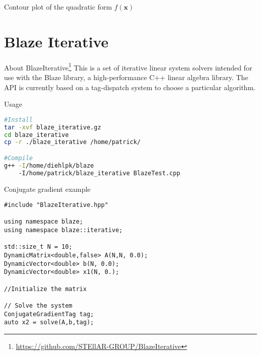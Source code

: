 \documentclass[12pt,t]{beamer}
\begin{document}
\begin{frame}{Contour plot of the quadratic form $f(\mathbf{x})$}

\begin{center}
\end{center}
\vspace{-0.5cm}
\end{frame}


\section{Blaze Iterative}


\begin{frame}[fragile]{About BlazeIterative\footnote{\tiny\url{https://github.com/STEllAR-GROUP/BlazeIterative}}}
This is a set of iterative linear system solvers intended for use with the Blaze library, a high-performance C++ linear algebra library. The API is currently based on a tag-dispatch system to choose a particular algorithm.

\begin{block}{Usage}
\begin{lstlisting}[language=bash]
#Install
tar -xvf blaze_iterative.gz
cd blaze_iterative
cp -r ./blaze_iterative /home/patrick/

#Compile
g++ -I/home/diehlpk/blaze 
    -I/home/patrick/blaze_iterative BlazeTest.cpp
\end{lstlisting}
\end{block}


\end{frame}

\begin{frame}[fragile]{Conjugate gradient example}
\begin{lstlisting}
#include "BlazeIterative.hpp"

using namespace blaze;
using namespace blaze::iterative;

std::size_t N = 10;
DynamicMatrix<double,false> A(N,N, 0.0);
DynamicVector<double> b(N, 0.0);
DynamicVector<double> x1(N, 0.);

//Initialize the matrix

// Solve the system
ConjugateGradientTag tag;
auto x2 = solve(A,b,tag);

\end{lstlisting}

\end{frame}
\end{document}
